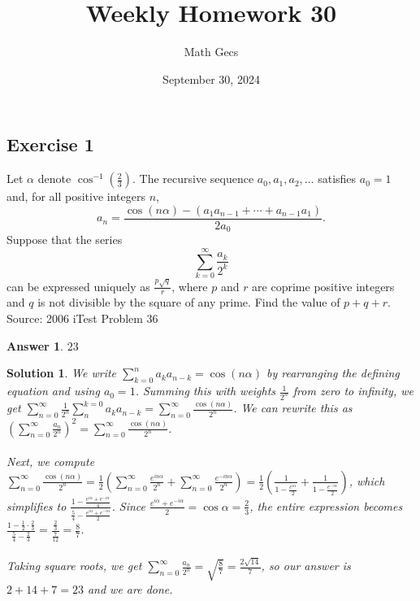 \documentclass[12pt]{article}
\title{Weekly Homework 30}
\author{Math Gecs}
\date{September 30, 2024}
\newtheorem*{answer*}{Answer}
\newtheorem*{solution*}{Solution}
\begin{document}
\maketitle

\subsection*{Exercise 1}
Let $\alpha$ denote $\cos^{-1}(\tfrac 23)$. The recursive sequence $a_0,a_1,a_2,\ldots$ satisfies $a_0 = 1$ and, for all positive integers $n$,\[a_n = \dfrac{\cos(n\alpha) - (a_1a_{n-1} + \cdots + a_{n-1}a_1)}{2a_0}.\]Suppose that the series\[\sum_{k=0}^\infty\dfrac{a_k}{2^k}\]can be expressed uniquely as $\tfrac{p\sqrt q}r$, where $p$ and $r$ are coprime positive integers and $q$ is not divisible by the square of any prime. Find the value of $p+q+r$.\\

Source: 2006 iTest Problem 36\\

\begin{answer*}
$\boxed{23}$
\end{answer*}

\begin{solution*}
We write $\sum_{k=0}^n a_k a_{n-k} = \cos(n\alpha)$ by rearranging the defining equation and using $a_0 = 1$. Summing this with weights $\frac{1}{2^n}$ from zero to infinity, we get $\sum_{n=0}^{\infty}\frac{1}{2^n}\sum_{n}^{k=0} a_k a_{n-k} = \sum_{n=0}^{\infty} \frac{\cos(n\alpha)}{2^n}$. We can rewrite this as $(\sum_{n=0}^{\infty} \frac{a_n}{2^n})^2 = \sum_{n=0}^{\infty} \frac{\cos(n\alpha)}{2^n}$.
\\ \\
Next, we compute$\sum_{n=0}^{\infty} \frac{\cos(n\alpha)}{2^n} = \frac{1}{2}(\sum_{n=0}^{\infty} \frac{e^{in\alpha}}{2^n} + \sum_{n=0}^{\infty} \frac{e^{-in\alpha}}{2^n}) = \frac{1}{2}(\frac{1}{1-\frac{e^{i\alpha}}{2}} + \frac{1}{1-\frac{e^{-i\alpha}}{2}})$, which simplifies to $\frac{1 - \frac{e^{i\alpha} + e^{-i\alpha}}{4}}{\frac{5}{4} - \frac{e^{i\alpha} + e^{-i\alpha}}{2}}$. Since $\frac{e^{i\alpha} + e^{-i\alpha}}{2} = \cos\alpha = \frac{2}{3}$, the entire expression becomes $\frac{1 - \frac{1}{2}\cdot\frac{2}{3}}{\frac{5}{4} - \frac{2}{3}} = \frac{\frac{2}{3}}{\frac{7}{12}} = \frac{8}{7}$.
\\ \\
Taking square roots, we get $\sum_{n=0}^{\infty} \frac{a_n}{2^n} = \sqrt{\frac{8}{7}} = \frac{2\sqrt{14}}{7}$, so our answer is $2 + 14 + 7 = \boxed{23}$ and we are done.
\end{solution*}
\end{document}
